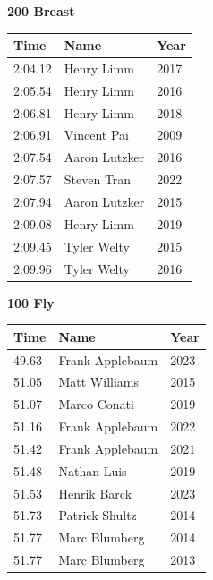\vspace{1.2em}
\noindent\begin{minipage}[t]{0.48\textwidth}
\centering
\textbf{\textcolor{teamprimary}{200 Breast}}\par
\vspace{0.5em}
\centering
\small
\renewcommand{\arraystretch}{1.0}
\setlength{\tabcolsep}{4pt}
\begin{tabular}{@{}p{1.8cm}p{3.0cm}p{1.0cm}@{}}
\toprule
\textbf{Time} & \textbf{Name} & \textbf{Year} \\
\midrule
2:04.12 & Henry Limm & 2017 \\
2:05.54 & Henry Limm & 2016 \\
2:06.81 & Henry Limm & 2018 \\
2:06.91 & Vincent Pai & 2009 \\
2:07.54 & Aaron Lutzker & 2016 \\
2:07.57 & Steven Tran & 2022 \\
2:07.94 & Aaron Lutzker & 2015 \\
2:09.08 & Henry Limm & 2019 \\
2:09.45 & Tyler Welty & 2015 \\
2:09.96 & Tyler Welty & 2016 \\
\bottomrule
\end{tabular}
\end{minipage}
\hfill
\begin{minipage}[t]{0.48\textwidth}
\centering
\textbf{\textcolor{teamprimary}{100 Fly}}\par
\vspace{0.5em}
\centering
\small
\renewcommand{\arraystretch}{1.0}
\setlength{\tabcolsep}{4pt}
\begin{tabular}{@{}p{1.8cm}p{3.0cm}p{1.0cm}@{}}
\toprule
\textbf{Time} & \textbf{Name} & \textbf{Year} \\
\midrule
49.63 & Frank Applebaum & 2023 \\
51.05 & Matt Williams & 2015 \\
51.07 & Marco Conati & 2019 \\
51.16 & Frank Applebaum & 2022 \\
51.42 & Frank Applebaum & 2021 \\
51.48 & Nathan Luis & 2019 \\
51.53 & Henrik Barck & 2023 \\
51.73 & Patrick Shultz & 2014 \\
51.77 & Marc Blumberg & 2014 \\
51.77 & Marc Blumberg & 2013 \\
\bottomrule
\end{tabular}
\end{minipage}
